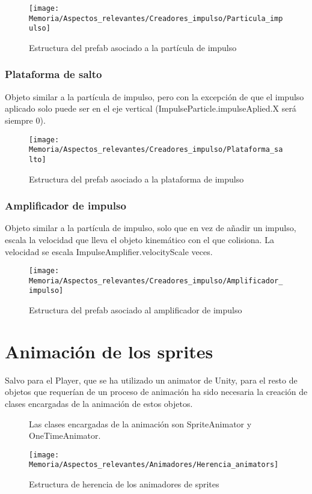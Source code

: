 \begin{figure}[h]
\texttt{[image: Memoria/Aspectos\_relevantes/Creadores\_impulso/Particula\_impulso]}
\caption{Estructura del prefab asociado a la partícula de impulso}
\end{figure}

\subsubsection{Plataforma de salto}
Objeto similar a la partícula de impulso, pero con la excepción de que el impulso aplicado solo puede ser en el eje vertical (ImpulseParticle.impulseAplied.X será siempre 0).

\begin{figure}[h]
\texttt{[image: Memoria/Aspectos\_relevantes/Creadores\_impulso/Plataforma\_salto]}
\caption{Estructura del prefab asociado a la plataforma de impulso}
\end{figure}

\subsubsection{Amplificador de impulso}
Objeto similar a la partícula de impulso, solo que en vez de añadir un impulso, escala la velocidad que lleva el objeto kinemático con el que colisiona. La velocidad se escala ImpulseAmplifier.velocityScale veces.

\begin{figure}[h]
\texttt{[image: Memoria/Aspectos\_relevantes/Creadores\_impulso/Amplificador\_impulso]}
\caption{Estructura del prefab asociado al amplificador de impulso}
\end{figure}

\section{Animación de los sprites}
Salvo para el Player, que se ha utilizado un animator de Unity, para el resto de objetos que requerían de un proceso de animación ha sido necesaria la creación de clases encargadas de la animación de estos objetos.\\

\begin{figure}[h]
Las clases encargadas de la animación son SpriteAnimator y OneTimeAnimator.

\texttt{[image: Memoria/Aspectos\_relevantes/Animadores/Herencia\_animators]}
\caption{Estructura de herencia de los animadores de sprites}
\end{figure}

